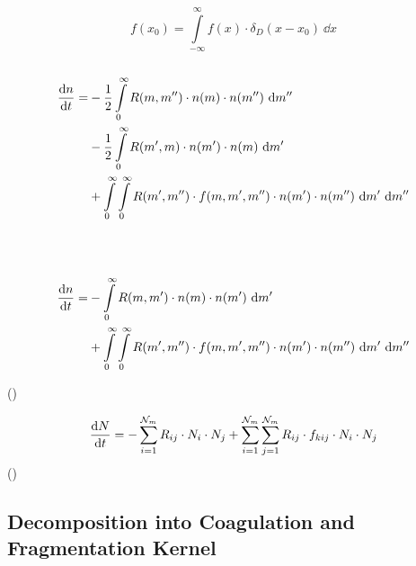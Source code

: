         \begin{equation}
            f(x_0) = \int\limits_{-\infty}^{\infty} f(x) \cdot \delta_D(x-x_0) \ \dd x 
        \end{equation}
         \\

        \begin{align}
            \frac{\text{d} n}{\text{d} t} =
            &-\frac{1}{2} \int\limits_0^\infty R(m,m'') \cdot n(m) \cdot n(m'') \ \text dm'' \\
            &-\frac{1}{2} \int\limits_0^\infty R(m',m) \cdot n(m') \cdot n(m) \ \text dm' \\
            &+\int\limits_0^\infty \int\limits_0^\infty R(m',m'') \cdot f(m,m',m'')
                \cdot n(m') \cdot n(m'') \ \text dm' \ \text dm''
        \end{align}

         \\
         \\
        \begin{align}
            \deriv{n}{t} =
            &-\int\limits_0^\infty R(m,m') \cdot n(m) \cdot n(m') \ \text dm' \\
            &+\int\limits_0^\infty \int\limits_0^\infty R(m',m'') \cdot f(m,m',m'')
                \cdot n(m') \cdot n(m'') \ \text dm' \ \text dm''
        \end{align}

        ()

        \begin{equation}
            \frac{\text{d} N}{\text{d} t} =
            -\sum_{i=1}^{\mathcal N_m} 
                R_{ij} \cdot N_i \cdot N_j 
            +\sum_{i=1}^{\mathcal N_m} \sum_{j=1}^{\mathcal N_m} 
                R_{ij} \cdot f_{kij} \cdot N_i \cdot N_j
        \end{equation}
        ()

    \clearpage\subsection{Decomposition into Coagulation and Fragmentation Kernel}


